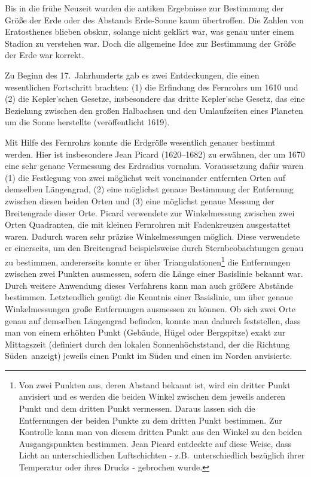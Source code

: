 Bis in die fr\"uhe Neuzeit wurden die antiken Ergebnisse zur Bestimmung der Gr\"o\ss e
der Erde oder des Abstands Erde-Sonne kaum \"ubertroffen. Die Zahlen von Eratosthenes
blieben obskur, solange nicht gekl\"art war, was genau unter einem Stadion zu verstehen war.
Doch die allgemeine Idee zur Bestimmung der Gr\"o\ss e der Erde war korrekt. 

Zu Beginn des 17.\ Jahrhunderts gab es zwei Entdeckungen, die einen wesentlichen
Fortschritt brachten: (1) die Erfindung des Fernrohrs um 1610 und (2) die Kepler'schen Gesetze,
insbesondere das dritte Kepler'sche Gesetz, das eine Beziehung zwischen den gro\ss en Halbachsen
und den Umlaufzeiten eines Planeten um die Sonne herstellte (ver\"offentlicht 1619). 

Mit Hilfe des Fernrohrs konnte die Erdgr\"o\ss e wesentlich genauer bestimmt werden. Hier ist
insbesondere 
Jean Picard (1620--1682) zu erw\"ahnen, der um 1670 eine sehr genaue Vermessung
des Erdradius vornahm. Voraussetzung daf\"ur waren (1) die Festlegung von zwei 
m\"oglichst weit voneinander entfernten Orten auf demselben L\"angengrad, (2) eine 
m\"oglichst genaue Bestimmung der Entfernung zwischen diesen beiden Orten und (3) eine
m\"oglichst genaue Messung der Breitengrade dieser Orte. Picard verwendete zur Winkelmessung
zwischen zwei Orten Quadranten, die mit kleinen Fernrohren mit Fadenkreuzen ausgestattet
waren. Dadurch waren sehr pr\"azise Winkelmessungen m\"oglich. Diese verwendete er einerseits,
um den Breitengrad beispielsweise durch Sternbeobachtungen genau zu bestimmen, andererseits
konnte er \"uber 
Triangulationen\footnote{Von zwei Punkten aus, deren Abstand bekannt ist, wird
ein dritter Punkt anvisiert und es werden die beiden Winkel zwischen dem jeweils anderen Punkt
und dem dritten Punkt vermessen. Daraus lassen sich die Entfernungen der beiden Punkte zu
dem dritten Punkt bestimmen. Zur Kontrolle kann man von diesem dritten Punkt aus den Winkel zu
den beiden Ausgangspunkten bestimmen. Jean Picard entdeckte auf diese Weise, dass Licht
an unterschiedlichen Luftschichten - z.B.\ unterschiedlich bez\"uglich ihrer Temperatur oder ihres
Drucks - gebrochen wurde.} 
die Entfernungen zwischen zwei Punkten ausmessen, sofern
die L\"ange einer Basislinie bekannt war. Durch weitere Anwendung dieses Verfahrens kann man
auch gr\"o\ss ere Abst\"ande bestimmen. Letztendlich gen\"ugt die Kenntnis einer Basislinie, um
\"uber genaue Winkelmessungen gro\ss e Entfernungen ausmessen zu k\"onnen. Ob sich zwei
Orte genau auf demselben L\"angengrad befinden, konnte man dadurch feststellen, dass man
von einem erh\"ohten Punkt (Geb\"aude, H\"ugel oder Bergspitze) exakt zur Mittagszeit (definiert
durch den lokalen Sonnenh\"ochststand, der die Richtung \glqq S\"uden\grqq\ anzeigt) 
jeweils einen Punkt im S\"uden und einen im Norden anvisierte. 

